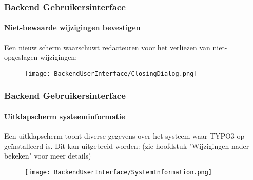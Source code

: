 \begin{frame}[fragile]
	\frametitle{Backend Gebruikersinterface}
	\framesubtitle{Niet-bewaarde wijzigingen bevestigen}

	Een nieuw scherm waarschuwt redacteuren voor het verliezen van niet-
	opgeslagen wijzigingen:

	\begin{figure}
		\texttt{[image: BackendUserInterface/ClosingDialog.png]}
	\end{figure}

\end{frame}

\begin{frame}[fragile]
	\frametitle{Backend Gebruikersinterface}
	\framesubtitle{Uitklapscherm systeeminformatie}

	Een uitklapscherm toont diverse gegevens over het systeem waar TYPO3 op
	geïnstalleerd is. Dit kan uitgebreid worden:\newline
	\small(zie hoofdstuk "Wijzigingen nader bekeken" voor meer details)\normalsize

	\begin{figure}
		\texttt{[image: BackendUserInterface/SystemInformation.png]}
	\end{figure}

\end{frame}

